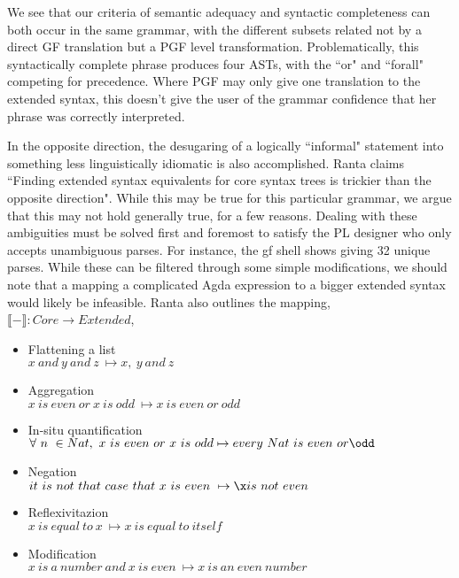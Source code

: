 
We see that our criteria of semantic adequacy and syntactic completeness can
both occur in the same grammar, with the different subsets related not by a
direct GF translation but a PGF level transformation. Problematically, this
syntactically complete phrase produces four ASTs, with the ``or" and ``forall"
competing for precedence. Where PGF may only give one translation to the
extended syntax, this doesn't give the user of the grammar confidence that her
phrase was correctly interpreted.

In the opposite direction, the desugaring of a logically ``informal"
statement into something less linguistically idiomatic is also accomplished.
Ranta claims ``Finding extended syntax equivalents for core syntax trees is
trickier than the opposite direction". While this may be true for this
particular grammar, we argue that this may not hold generally true, for a few
reasons. Dealing with these ambiguities must be
solved first and foremost to satisfy the PL designer who only accepts
unambiguous parses. For instance, the gf shell shows  giving 32
unique parses. While these can be filtered through some simple modifications, we
should note that a mapping a complicated Agda expression to a bigger extended syntax 
would likely be infeasible. Ranta also outlines the mapping, $\llbracket -
\rrbracket : Core \to Extended$,

\begin{itemize}
\item Flattening a list \\
  $x\ and\ y\ and\ z\ \mapsto x,\ y\ and\ z$
\item Aggregation \\
  $x\ is\ even\ or\ x\ is\ odd\ \mapsto x\ is\ even\ or\ odd$
\item In-situ quantification \\
  $\forall\ n\ \in Nat,\ x\ is\ even\ or\ x\ is\ odd \mapsto every\ Nat\ is\ even\ or \odd$
\item Negation \\
  $it\ is\ not\ that\ case\ that\ x\ is\ even\ \mapsto \x is\ not\ even$
\item Reflexivitazion \\
  $x\ is\ equal\ to\ x\ \mapsto x\ is\ equal\ to\ itself$
\item Modification \\
  $x\ is\ a\ number\ and\ x\ is\ even\ \mapsto x\ is\ an\ even\ number$
\end{itemize}

